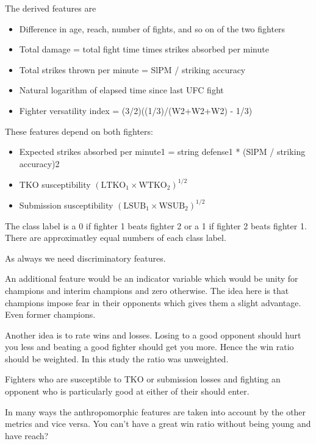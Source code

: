 \noindent
The derived features are

\begin{itemize}[noitemsep]
  \item Difference in age, reach, number of fights, and so on of the two fighters
  \item Total damage = total fight time times strikes absorbed per minute
  \item Total strikes thrown per minute = SlPM / striking accuracy
  \item Natural logarithm of elapsed time since last UFC fight
  \item Fighter versatility index = (3/2)((1/3)/(W2+W2+W2) - 1/3)
\end{itemize}

\noindent
These features depend on both fighters:

\begin{itemize}[noitemsep]
  \item Expected strikes absorbed per minute1 = string defense1 * (SlPM / striking accuracy)2
  \item TKO susceptibility $(\textrm{LTKO}_1 \times \textrm{WTKO}_2)^{1/2}$
  \item Submission susceptibility $(\textrm{LSUB}_1 \times \textrm{WSUB}_2)^{1/2}$
\end{itemize}

The class label is a 0 if fighter 1 beats fighter 2 or
a 1 if fighter 2 beats fighter 1.
There are approximatley
equal numbers of each class label.

As always we need discriminatory features.

An additional feature would be an indicator variable
which would be unity for champions and interim champions
and zero otherwise. The idea here is that champions
impose fear in their opponents which gives them a slight
advantage. Even former champions.

Another idea is to rate wins and losses. Losing to a good
opponent should hurt you less and beating a good fighter
should get you more. Hence the win ratio should be
weighted. In this study the ratio was unweighted.

Fighters who are susceptible to TKO or submission
losses and fighting an opponent who is particularly
good at either of their should enter.

In many ways the anthropomorphic features are taken
into account by the other metrics and vice versa.
You can't have a great win ratio without being
young and have reach?

